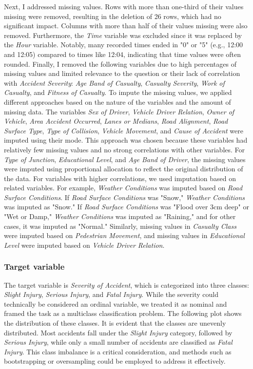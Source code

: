 \documentclass{article}
\begin{document}
Next, I addressed missing values. Rows with more than one-third of their values missing were removed, resulting in the deletion of 26 rows, which had no significant impact. Columns with more than half of their values missing were also removed. Furthermore, the \textit{Time} variable was excluded since it was replaced by the \textit{Hour} variable. Notably, many recorded times ended in "0" or "5" (e.g., 12:00 and 12:05) compared to times like 12:04, indicating that time values were often rounded.
Finally, I removed the following variables due to high percentages of missing values and limited relevance to the question or their lack of correlation with \textit{Accident Severity}: \textit{Age Band of Casualty}, \textit{Casualty Severity}, \textit{Work of Casualty}, and \textit{Fitness of Casualty}.
\newline
To impute the missing values, we applied different approaches based on the nature of the variables and the amount of missing data. The variables \textit{Sex of Driver}, \textit{Vehicle Driver Relation}, \textit{Owner of Vehicle}, \textit{Area Accident Occurred}, \textit{Lanes or Medians}, \textit{Road Alignment}, \textit{Road Surface Type}, \textit{Type of Collision}, \textit{Vehicle Movement}, and \textit{Cause of Accident} were imputed using their mode. This approach was chosen because these variables had relatively few missing values and no strong correlations with other variables.
For \textit{Type of Junction}, \textit{Educational Level}, and \textit{Age Band of Driver}, the missing values were imputed using proportional allocation to reflect the original distribution of the data.
For variables with higher correlations, we used imputation based on related variables. For example, \textit{Weather Conditions} was imputed based on \textit{Road Surface Conditions}. If \textit{Road Surface Conditions} was "Snow," \textit{Weather Conditions} was imputed as "Snow." If \textit{Road Surface Conditions} was "Flood over 3cm deep" or "Wet or Damp," \textit{Weather Conditions} was imputed as "Raining," and for other cases, it was imputed as "Normal." Similarly, missing values in \textit{Casualty Class} were imputed based on \textit{Pedestrian Movement}, and missing values in \textit{Educational Level} were imputed based on \textit{Vehicle Driver Relation}.


\subsubsection{Target variable}
The target variable is \textit{Severity of Accident}, which is categorized into three classes: \textit{Slight Injury}, \textit{Serious Injury}, and \textit{Fatal Injury}. While the severity could technically be considered an ordinal variable, we treated it as nominal and framed the task as a multiclass classification problem.
The following plot shows the distribution of these classes. It is evident that the classes are unevenly distributed. Most accidents fall under the \textit{Slight Injury} category, followed by \textit{Serious Injury}, while only a small number of accidents are classified as \textit{Fatal Injury}. This class imbalance is a critical consideration, and methods such as bootstrapping or oversampling could be employed to address it effectively.
\end{document}
